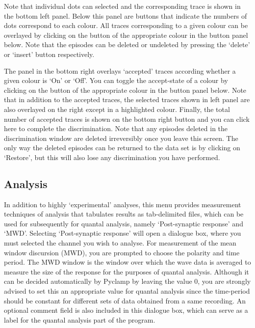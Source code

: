 \documentclass{article}
\begin{document}
Note that individual dots can selected and the corresponding trace is shown in the bottom left panel. Below this panel
are buttons that indicate the numbers of dots correspond to each colour. All traces corresponding to a given colour can
be overlayed by clicking on the button of the appropriate colour in the button panel below. Note that the episodes can
be deleted or undeleted by pressing the `delete' or `insert' button respectively.

The panel in the bottom right overlays `accepted' traces according whether a given colour is `On' or `Off'. You can
toggle the accept-state of a colour by clicking on the button of the appropriate colour in the button panel below. Note
that in addition to the accepted traces, the selected traces shown in left panel are also overlayed on the right except
in a highlighted colour. Finally, the total number of accepted traces is shown on the bottom right button and you can
click here to complete the discrimination. Note that any episodes deleted in the discrimination window are deleted
irreversibly once you leave this screen. The only way the deleted episodes can be returned to the data set is by
clicking on `Restore', but this will also lose any discrimination you have performed.

\subsection{Analysis}

In addition to highly `experimental' analyses, this menu provides measurement techniques of analysis that tabulates
results as tab-delimited files, which can be used for subsequently for quantal analysis, namely `Post-synaptic response'
and `MWD'. Selecting `Post-synaptic response' will open a dialogue box, where you must selected the channel you wish to
analyse. For measurement of the mean window discursion (MWD), you are prompted to choose the polarity and time period.
The MWD window is the window over which the wave data is averaged to measure the size of the response for the purposes
of quantal analysis. Although it can be decided automatically by Pyclamp by leaving the value 0, you are strongly
advised to set this an appropriate value for quantal analysis since the time-period should be constant for different
sets of data obtained from a same recording. An optional comment field is also included in this dialogue box, which can
serve as a label for the quantal analysis part of the program.
\end{document}

